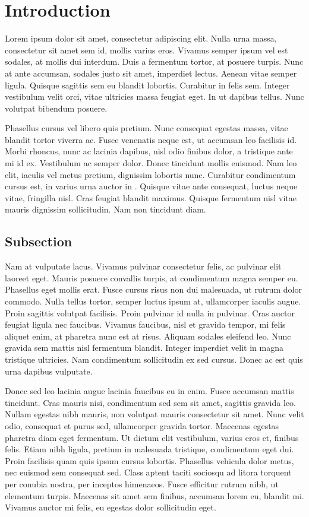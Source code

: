 \section{Introduction}
Lorem ipsum dolor sit amet, consectetur adipiscing elit. Nulla urna massa, consectetur sit amet sem id, mollis varius eros. Vivamus semper ipsum vel est sodales, at mollis dui interdum. Duis a fermentum tortor, at posuere turpis. Nunc at ante accumsan, sodales justo sit amet, imperdiet lectus. Aenean vitae semper ligula. Quisque sagittis sem eu blandit lobortis. Curabitur in felis sem. Integer vestibulum velit orci, vitae ultricies massa feugiat eget. In ut dapibus tellus. Nunc volutpat bibendum posuere.

Phasellus cursus vel libero quis pretium. Nunc consequat egestas massa, vitae blandit tortor viverra ac. Fusce venenatis neque est, ut accumsan leo facilisis id. Morbi rhoncus, nunc ac lacinia dapibus, nisl odio finibus dolor, a tristique ante mi id ex. Vestibulum ac semper dolor. Donec tincidunt mollis euismod. Nam leo elit, iaculis vel metus pretium, dignissim lobortis nunc. Curabitur condimentum cursus est, in varius urna auctor in \cite{hectorthøgersen2310}. Quisque vitae ante consequat, luctus neque vitae, fringilla nisl. Cras feugiat blandit maximus. Quisque fermentum nisl vitae mauris dignissim sollicitudin. Nam non tincidunt diam.

\subsection{Subsection}
Nam at vulputate lacus. Vivamus pulvinar consectetur felis, ac pulvinar elit laoreet eget. Mauris posuere convallis turpis, at condimentum magna semper eu. Phasellus eget mollis erat. Fusce cursus risus non dui malesuada, ut rutrum dolor commodo. Nulla tellus tortor, semper luctus ipsum at, ullamcorper iaculis augue. Proin sagittis volutpat facilisis. Proin pulvinar id nulla in pulvinar. Cras auctor feugiat ligula nec faucibus. Vivamus faucibus, nisl et gravida tempor, mi felis aliquet enim, at pharetra nunc est at risus. Aliquam sodales eleifend leo. Nunc gravida sem mattis nisl fermentum blandit. Integer imperdiet velit in magna tristique ultricies. Nam condimentum sollicitudin ex sed cursus. Donec ac est quis urna dapibus vulputate.

Donec sed leo lacinia augue lacinia faucibus eu in enim. Fusce accumsan mattis tincidunt. Cras mauris nisi, condimentum sed sem sit amet, sagittis gravida leo. Nullam egestas nibh mauris, non volutpat mauris consectetur sit amet. Nunc velit odio, consequat et purus sed, ullamcorper gravida tortor. Maecenas egestas pharetra diam eget fermentum. Ut dictum elit vestibulum, varius eros et, finibus felis. Etiam nibh ligula, pretium in malesuada tristique, condimentum eget dui. Proin facilisis quam quis ipsum cursus lobortis. Phasellus vehicula dolor metus, nec euismod sem consequat sed. Class aptent taciti sociosqu ad litora torquent per conubia nostra, per inceptos himenaeos. Fusce efficitur rutrum nibh, ut elementum turpis. Maecenas sit amet sem finibus, accumsan lorem eu, blandit mi. Vivamus auctor mi felis, eu egestas dolor sollicitudin eget.

